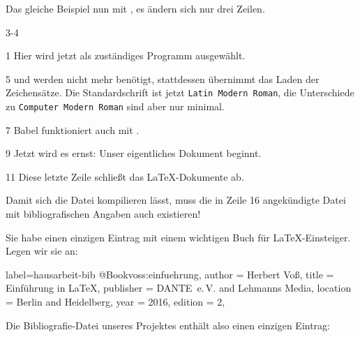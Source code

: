 Das gleiche Beispiel nun mit \LuaLaTeX{}, es ändern sich nur drei Zeilen.
 

\begin{labeling}{3-4}

 \item[1] Hier wird jetzt \LuaLaTeX{} als zuständiges Programm ausgewählt. 
  
 \item[5]  und  werden nicht mehr benötigt,
   stattdessen übernimmt  das Laden der Zeichensätze.  Die
   Standardschrift ist jetzt \texttt{Latin Modern Roman}, die Unterschiede
   zu \texttt{Computer Modern Roman} sind aber nur minimal. 

 \item[7] Babel funktioniert auch mit \LuaLaTeX{}.
 
 \item[9] Jetzt wird es ernst: Unser eigentliches Dokument beginnt.
 
 \item[11] Diese letzte Zeile schließt das \LaTeX -Dokumente ab.

 \end{labeling}

 

Damit sich die Datei kompilieren lässt, muss die in Zeile 16 angekündigte Datei mit 
bibliografischen Angaben auch existieren!

Sie habe einen einzigen Eintrag mit einem wichtigen Buch für \LaTeX -Einsteiger.
Legen wir sie an:

\begin{lfgwcode}{label={hausarbeit-bib}}
@Book{voss:einfuehrung,
 author    = {Herbert Voß}, 
 title     = {Einführung in \LaTeX},
 publisher = {DANTE~e.\,V. and Lehmanns Media},
 location  = {Berlin and Heidelberg},
 year      = {2016},
 edition   = {2},
}
\end{lfgwcode}

Die Bibliografie-Datei unseres Projektes enthält also einen einzigen Eintrag:
\bigskip

